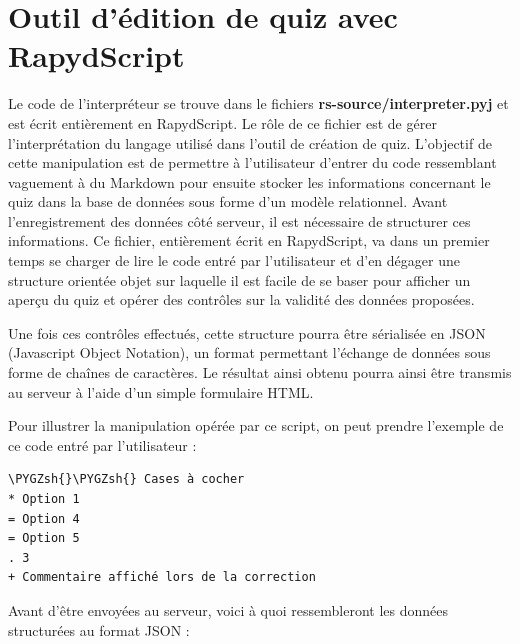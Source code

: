 \documentclass[a4,10pt,french]{sphinxmanual}
\def\PYGZsh{\char`\#}
\begin{document}
\chapter{Outil d'édition de quiz avec RapydScript}
\label{front-end::doc}\label{front-end:outil-d-edition-de-quiz-avec-rapydscript}
Le code de l'interpréteur se trouve dans le fichiers \textbf{rs-source/interpreter.pyj} et est écrit entièrement
en RapydScript. Le rôle de ce fichier est de gérer l'interprétation du langage utilisé dans l'outil
de création de quiz.
L'objectif de cette manipulation est de permettre à l'utilisateur
d'entrer du code ressemblant vaguement à du Markdown pour ensuite stocker les informations
concernant le quiz dans la base de données sous forme d'un modèle relationnel. Avant l'enregistrement
des données côté serveur, il est nécessaire de structurer ces informations. Ce fichier,
entièrement écrit en RapydScript, va dans un premier temps se charger de lire le code entré par l'utilisateur
et d'en dégager une structure orientée objet sur laquelle il est facile de se baser
pour afficher un aperçu du quiz et opérer des contrôles sur la validité des données
proposées.

Une fois ces contrôles effectués, cette structure pourra être sérialisée
en JSON (Javascript Object Notation), un format permettant l'échange de données sous
forme de chaînes de caractères. Le résultat ainsi obtenu pourra ainsi être
transmis au serveur à l'aide d'un simple formulaire HTML.

Pour illustrer la manipulation opérée par ce script, on peut prendre l'exemple
de ce code entré par l'utilisateur :

\begin{Verbatim}[commandchars=\\\{\}]
\PYGZsh{}\PYGZsh{} Cases à cocher
* Option 1
= Option 4
= Option 5
. 3
+ Commentaire affiché lors de la correction
\end{Verbatim}

Avant d'être envoyées au serveur, voici à quoi ressembleront les données structurées
au format JSON :
\end{document}
